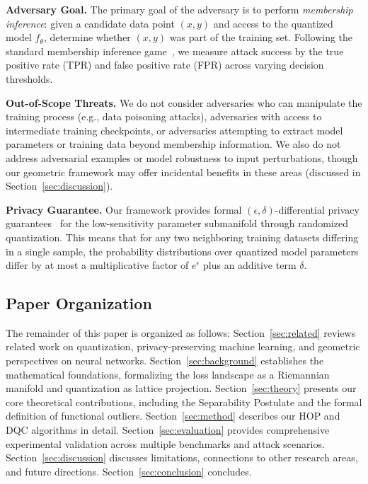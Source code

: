 \documentclass[letterpaper,twocolumn,10pt]{article}
\begin{document}
\textbf{Adversary Goal.} The primary goal of the adversary is to perform \emph{membership inference}: given a candidate data point $(x, y)$ and access to the quantized model $f_\theta$, determine whether $(x, y)$ was part of the training set. Following the standard membership inference game~\cite{yeom2018privacy}, we measure attack success by the true positive rate (TPR) and false positive rate (FPR) across varying decision thresholds.

\textbf{Out-of-Scope Threats.} We do not consider adversaries who can manipulate the training process (e.g., data poisoning attacks), adversaries with access to intermediate training checkpoints, or adversaries attempting to extract model parameters or training data beyond membership information. We also do not address adversarial examples or model robustness to input perturbations, though our geometric framework may offer incidental benefits in these areas (discussed in Section~\ref{sec:discussion}).

\textbf{Privacy Guarantee.} Our framework provides formal $(\epsilon, \delta)$-differential privacy guarantees~\cite{dwork2014algorithmic} for the low-sensitivity parameter submanifold through randomized quantization. This means that for any two neighboring training datasets differing in a single sample, the probability distributions over quantized model parameters differ by at most a multiplicative factor of $e^\epsilon$ plus an additive term $\delta$.

\subsection{Paper Organization}

The remainder of this paper is organized as follows: Section~\ref{sec:related} reviews related work on quantization, privacy-preserving machine learning, and geometric perspectives on neural networks. Section~\ref{sec:background} establishes the mathematical foundations, formalizing the loss landscape as a Riemannian manifold and quantization as lattice projection. Section~\ref{sec:theory} presents our core theoretical contributions, including the Separability Postulate and the formal definition of functional outliers. Section~\ref{sec:method} describes our HOP and DQC algorithms in detail. Section~\ref{sec:evaluation} provides comprehensive experimental validation across multiple benchmarks and attack scenarios. Section~\ref{sec:discussion} discusses limitations, connections to other research areas, and future directions. Section~\ref{sec:conclusion} concludes.
\end{document}
